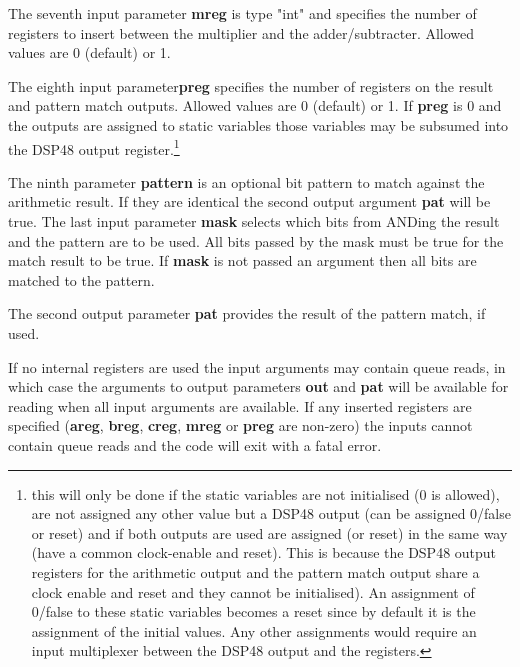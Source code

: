             The seventh input parameter {\bf mreg} is type "int" and specifies
            the number of registers to insert between the multiplier and the
            adder/subtracter. Allowed values are 0 (default) or 1.

            The eighth input parameter{\bf preg} specifies the number of
            registers on the result and pattern match outputs. Allowed values
            are 0 (default) or 1. If {\bf preg} is 0 and the outputs are
            assigned to static variables those variables may be subsumed into
            the DSP48 output register.\footnote{this will only be done if the
            static variables are not initialised (0 is allowed), are not
            assigned any other value but a DSP48 output (can be assigned 0/false
            or reset) and if both outputs are used are assigned (or reset) in
            the same way (have a common clock-enable and reset). This is because
            the DSP48 output registers for the arithmetic output and
            the pattern match output share a clock enable and reset and they
            cannot be initialised). An assignment of 0/false to these static
            variables becomes a reset since by default it is the assignment of
            the initial values. Any other assignments would require an input
            multiplexer between the DSP48 output and the registers.}

            The ninth parameter {\bf pattern} is an optional bit pattern to
            match against the arithmetic result. If they are identical the
            second output argument {\bf pat} will be true. The last input
            parameter {\bf mask} selects which bits from ANDing the result and
            the pattern are to be used. All bits passed by the mask must be true
            for the match result to be true. If {\bf mask} is not passed an
            argument then all bits are matched to the pattern.

            The second output parameter {\bf pat} provides the result of the
            pattern match, if used.

            If no internal registers are used the input arguments may contain
            queue reads, in which case the arguments to output parameters {\bf
            out} and {\bf pat} will be available for reading when all input
            arguments are available. If any inserted registers are specified
            ({\bf areg}, {\bf breg}, {\bf creg}, {\bf mreg} or {\bf preg} are
            non-zero) the inputs cannot contain queue reads and the code will
            exit with a fatal error.


